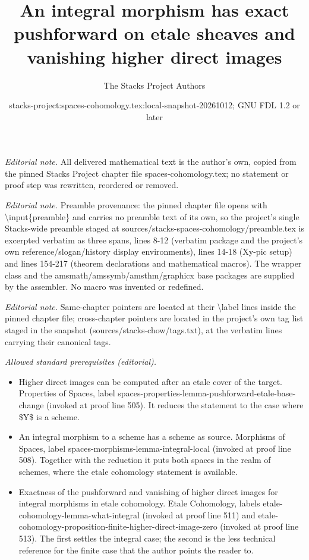 \documentclass[10pt,a4paper]{amsart}
\title{An integral morphism has exact pushforward on etale sheaves and vanishing higher direct images}
\author{The Stacks Project Authors}
\date{stacks-project:spaces-cohomology.tex:local-snapshot-20261012; GNU FDL 1.2 or later}
\theoremstyle{plain}
\theoremstyle{definition}
\theoremstyle{remark}
\numberwithin{equation}{subsection}
\begin{document}
\maketitle
\noindent\textit{Editorial note.} All delivered mathematical text is the author's own, copied from the pinned Stacks Project chapter file spaces-cohomology.tex; no statement or proof step was rewritten, reordered or removed.\par\medskip
\noindent\textit{Editorial note.} Preamble provenance: the pinned chapter file opens with \textbackslash{}input\{preamble\} and carries no preamble text of its own, so the project's single Stacks-wide preamble staged at sources/stacks-spaces-cohomology/preamble.tex is excerpted verbatim as three spans, lines 8-12 (verbatim package and the project's own reference/slogan/history display environments), lines 14-18 (Xy-pic setup) and lines 154-217 (theorem declarations and mathematical macros). The wrapper class and the amsmath/amssymb/amsthm/graphicx base packages are supplied by the assembler. No macro was invented or redefined.\par\medskip
\noindent\textit{Editorial note.} Same-chapter pointers are located at their \textbackslash{}label lines inside the pinned chapter file; cross-chapter pointers are located in the project's own tag list staged in the snapshot (sources/stacks-chow/tags.txt), at the verbatim lines carrying their canonical tags.\par\medskip
\noindent\textit{Allowed standard prerequisites (editorial).}\begin{itemize}
\item Higher direct images can be computed after an etale cover of the target. Properties of Spaces, label spaces-properties-lemma-pushforward-etale-base-change (invoked at proof line 505). It reduces the statement to the case where \$Y\$ is a scheme.
\item An integral morphism to a scheme has a scheme as source. Morphisms of Spaces, label spaces-morphisms-lemma-integral-local (invoked at proof line 508). Together with the reduction it puts both spaces in the realm of schemes, where the etale cohomology statement is available.
\item Exactness of the pushforward and vanishing of higher direct images for integral morphisms in etale cohomology. Etale Cohomology, labels etale-cohomology-lemma-what-integral (invoked at proof line 511) and etale-cohomology-proposition-finite-higher-direct-image-zero (invoked at proof line 513). The first settles the integral case; the second is the less technical reference for the finite case that the author points the reader to.
\end{itemize}\medskip
\end{document}
